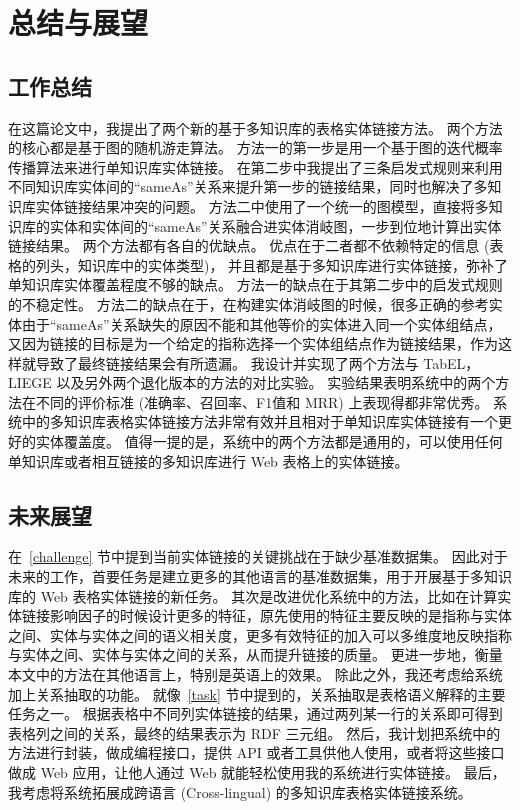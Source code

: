 \chapter{总结与展望}

\section{工作总结}
在这篇论文中，我提出了两个新的基于多知识库的表格实体链接方法。
两个方法的核心都是基于图的随机游走算法。
方法一的第一步是用一个基于图的迭代概率传播算法来进行单知识库实体链接。
在第二步中我提出了三条启发式规则来利用不同知识库实体间的``sameAs''关系来提升第一步的链接结果，同时也解决了多知识库实体链接结果冲突的问题。
方法二中使用了一个统一的图模型，直接将多知识库的实体和实体间的``sameAs''关系融合进实体消岐图，一步到位地计算出实体链接结果。
两个方法都有各自的优缺点。
优点在于二者都不依赖特定的信息 (表格的列头，知识库中的实体类型)，
并且都是基于多知识库进行实体链接，弥补了单知识库实体覆盖程度不够的缺点。
方法一的缺点在于其第二步中的启发式规则的不稳定性。
方法二的缺点在于，在构建实体消岐图的时候，很多正确的参考实体由于``sameAs''关系缺失的原因不能和其他等价的实体进入同一个实体组结点，又因为链接的目标是为一个给定的指称选择一个实体组结点作为链接结果，作为这样就导致了最终链接结果会有所遗漏。
我设计并实现了两个方法与 TabEL\cite{bhagavatula2015tabel}，LIEGE\cite{shen2012liege} 以及另外两个退化版本的方法的对比实验。
实验结果表明系统中的两个方法在不同的评价标准 (准确率、召回率、F1值和 MRR) 上表现得都非常优秀。
系统中的多知识库表格实体链接方法非常有效并且相对于单知识库实体链接有一个更好的实体覆盖度。
值得一提的是，系统中的两个方法都是通用的，可以使用任何单知识库或者相互链接的多知识库进行 Web 表格上的实体链接。


\section{未来展望}
在~\ref{challenge} 节中提到当前实体链接的关键挑战在于缺少基准数据集。
因此对于未来的工作，首要任务是建立更多的其他语言的基准数据集，用于开展基于多知识库的 Web 表格实体链接的新任务。
其次是改进优化系统中的方法，比如在计算实体链接影响因子的时候设计更多的特征，原先使用的特征主要反映的是指称与实体之间、实体与实体之间的语义相关度，更多有效特征的加入可以多维度地反映指称与实体之间、实体与实体之间的关系，从而提升链接的质量。
更进一步地，衡量本文中的方法在其他语言上，特别是英语上的效果。
除此之外，我还考虑给系统加上关系抽取的功能。
就像~\ref{task} 节中提到的，关系抽取是表格语义解释的主要任务之一。
根据表格中不同列实体链接的结果，通过两列某一行的关系即可得到表格列之间的关系，最终的结果表示为 RDF 三元组。
然后，我计划把系统中的方法进行封装，做成编程接口，提供 API 或者工具供他人使用，或者将这些接口做成 Web 应用，让他人通过 Web 就能轻松使用我的系统进行实体链接。
最后，我考虑将系统拓展成跨语言\cite{zhang2013cross} (Cross-lingual) 的多知识库表格实体链接系统。







